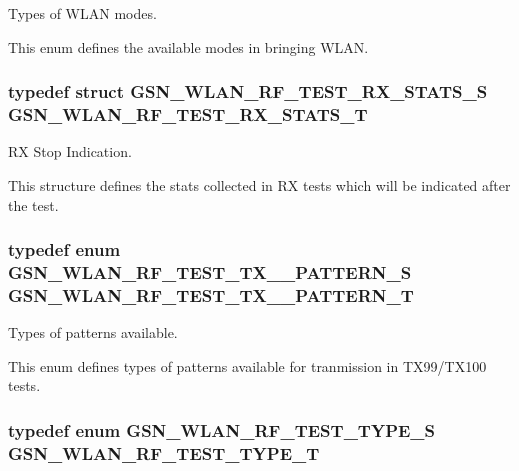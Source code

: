 Types of WLAN modes. 

This enum defines the available modes in bringing WLAN. \hypertarget{a00677_ga150fdf6ec3c7c370b27651412b36653a}{
\subsubsection[{GSN\_\-WLAN\_\-RF\_\-TEST\_\-RX\_\-STATS\_\-T}]{\setlength{\rightskip}{0pt plus 5cm}typedef struct {\bf GSN\_\-WLAN\_\-RF\_\-TEST\_\-RX\_\-STATS\_\-S} {\bf GSN\_\-WLAN\_\-RF\_\-TEST\_\-RX\_\-STATS\_\-T}}}
\label{a00677_ga150fdf6ec3c7c370b27651412b36653a}


RX Stop Indication. 

This structure defines the stats collected in RX tests which will be indicated after the test. \hypertarget{a00677_gaf2d0e783b6db5c93a78ee3d99153ebcb}{
\subsubsection[{GSN\_\-WLAN\_\-RF\_\-TEST\_\-TX\_\-99\_\-PATTERN\_\-T}]{\setlength{\rightskip}{0pt plus 5cm}typedef enum {\bf GSN\_\-WLAN\_\-RF\_\-TEST\_\-TX\_\_\-PATTERN\_\-S} {\bf GSN\_\-WLAN\_\-RF\_\-TEST\_\-TX\_\_\-PATTERN\_\-T}}}
\label{a00677_gaf2d0e783b6db5c93a78ee3d99153ebcb}


Types of patterns available. 

This enum defines types of patterns available for tranmission in TX99/TX100 tests. \hypertarget{a00677_ga58d933da4429968a4151ae6b2106281b}{
\subsubsection[{GSN\_\-WLAN\_\-RF\_\-TEST\_\-TYPE\_\-T}]{\setlength{\rightskip}{0pt plus 5cm}typedef enum {\bf GSN\_\-WLAN\_\-RF\_\-TEST\_\-TYPE\_\-S} {\bf GSN\_\-WLAN\_\-RF\_\-TEST\_\-TYPE\_\-T}}}
\label{a00677_ga58d933da4429968a4151ae6b2106281b}


